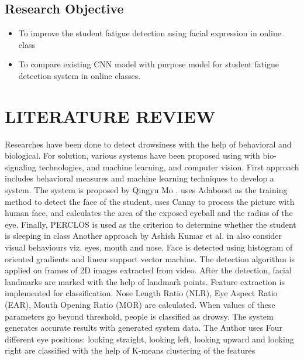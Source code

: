 \documentclass[a4paper,12pt]{report}
\begin{document}
\clearpage
\section{Research Objective}
\begin{itemize}
	\item To improve the student fatigue detection using facial expression in online class
	\item To compare existing CNN model with purpose model for student fatigue detection system in online classes.
\end{itemize}

\chapter{LITERATURE REVIEW}
Researches have been done to detect drowsiness with the help of behavioral and biological. 
For solution, various systems have been proposed using with bio-signaling technologies, 
and machine learning, and computer vision.
\newline
\newline
First approach includes behavioral measures and machine learning techniques to develop  a system. The system is proposed by Qingyu Mo \cite{Mo_2021}.  uses Adaboost as the training method 
to detect the face of the student, uses Canny to process the picture with human face, and 
calculates the area of the exposed eyeball and the radius of the eye. Finally, PERCLOS is 
used as the criterion to determine whether the student is sleeping in class
\newline
\newline
Another approach by Ashish Kumar et al. in \cite{8405495} also consider visual behaviours viz. eyes, 
mouth and nose. Face is detected using histogram of oriented gradients and linear support 
vector machine. The detection algorithm is applied on frames of 2D images extracted from 
video. After the detection, facial landmarks are marked with the help of landmark points. 
Feature extraction is implemented for classification. Nose Length Ratio (NLR), Eye Aspect 
Ratio (EAR), Mouth Opening Ratio (MOR) are calculated. When values of these 
parameters go beyond threshold, people is classified as drowsy. The system generates 
accurate results with generated system data.
\newline
\newline
The Author \cite{article} uses Four different eye positions: looking straight, looking left, looking 
upward and looking right are classified with the help of K-means clustering of the features 
\end{document}
